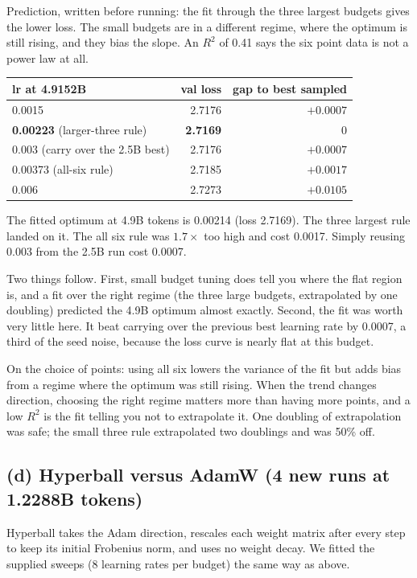 \documentclass[10pt,letterpaper]{article}
\begin{document}
Prediction, written before running: the fit through the three largest budgets gives the lower loss. The small budgets are in a different regime, where the optimum is still rising, and they bias the slope. An $R^2$ of 0.41 says the six point data is not a power law at all.

\begin{table}[H]\centering\small
\begin{tabular}{lrr}\toprule
lr at 4.9152B & val loss & gap to best sampled\\\midrule
0.0015 & 2.7176 & $+0.0007$\\
\textbf{0.00223} (larger-three rule) & \textbf{2.7169} & 0\\
0.003 (carry over the 2.5B best) & 2.7176 & $+0.0007$\\
0.00373 (all-six rule) & 2.7185 & $+0.0017$\\
0.006 & 2.7273 & $+0.0105$\\\bottomrule
\end{tabular}
\end{table}

The fitted optimum at 4.9B tokens is 0.00214 (loss 2.7169). The three largest rule landed on it. The all six rule was $1.7\times$ too high and cost 0.0017. Simply reusing 0.003 from the 2.5B run cost 0.0007.

Two things follow. First, small budget tuning does tell you where the flat region is, and a fit over the right regime (the three large budgets, extrapolated by one doubling) predicted the 4.9B optimum almost exactly. Second, the fit was worth very little here. It beat carrying over the previous best learning rate by 0.0007, a third of the seed noise, because the loss curve is nearly flat at this budget.

On the choice of points: using all six lowers the variance of the fit but adds bias from a regime where the optimum was still rising. When the trend changes direction, choosing the right regime matters more than having more points, and a low $R^2$ is the fit telling you not to extrapolate it. One doubling of extrapolation was safe; the small three rule extrapolated two doublings and was 50\% off.

\subsection*{(d) Hyperball versus AdamW (4 new runs at 1.2288B tokens)}

Hyperball takes the Adam direction, rescales each weight matrix after every step to keep its initial Frobenius norm, and uses no weight decay. We fitted the supplied sweeps (8 learning rates per budget) the same way as above.
\end{document}
